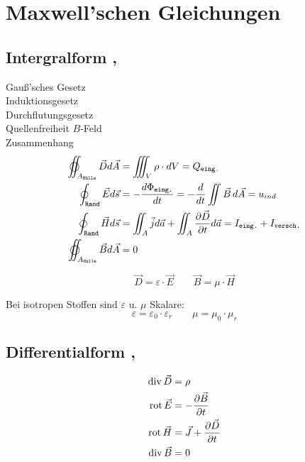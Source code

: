 \section{Maxwell’schen Gleichungen}

\subsection{Intergralform , }
Gauß'sches Gesetz\\
Induktionsgesetz\\
Durchflutungsgesetz\\
Quellenfreiheit $B$-Feld\\
Zusammenhang
\begin{align*}
    \varoiint_{A_\texttt{Hülle}} \vec{D} d \vec{A} & = \iiint_{V} \rho \cdot dV = Q_\texttt{eing.}                                                                 \\
    \oint_\texttt{Rand} \vec{E} d \vec{s}          & = -\dfrac{d\Phi_\texttt{eing.}}{dt} = -\frac{d}{dt} \iint \vec{B} \, d\vec{A} = u_{ind} \\
    \oint_\texttt{Rand} \vec{H} d \vec{s}          & = \iint_{A} \vec{j} d \vec{a} + \iint_{A}\frac{ \partial \vec{D}}{ \partial t} d \vec{a} = I_\texttt{eing.} + I_\texttt{versch.}                                                 \\
    \varoiint_{A_\texttt{Hülle}} \vec{B} d \vec{A} & = 0
\end{align*}

\[
    \vec{D} = \varepsilon \cdot \vec{E} \qquad
    \vec{B} = \mu \cdot \vec{H}
\]

Bei isotropen Stoffen sind $\varepsilon$ u. $\mu$ Skalare:
\[
    \varepsilon = \varepsilon_0 \cdot \varepsilon_r \qquad \mu = \mu_0 \cdot \mu_r
\]

\subsection{Differentialform , }
\begin{align*}
    \operatorname{div} \vec{D}             & = \rho                                           \\
    \operatorname{rot} \vec{E} & = -\dfrac{\partial \vec{B}}{\partial t}          \\
    \operatorname{rot} \vec{H} & = \vec{J} + \dfrac{\partial \vec{D}}{\partial t} \\
    \operatorname{div} \vec{B}             & = 0
\end{align*}

